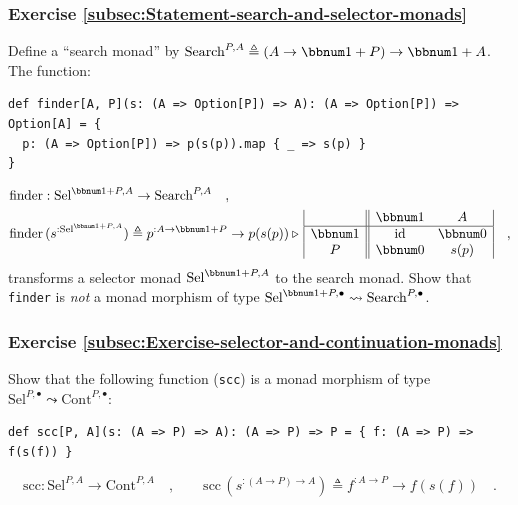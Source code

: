 \subsubsection{Exercise \label{subsec:Statement-search-and-selector-monads}\ref{subsec:Statement-search-and-selector-monads}}

Define a \textsf{``}search
monad\textsf{''} by $\text{Search}^{P,A}\triangleq(A\rightarrow\bbnum 1+P)\rightarrow\bbnum 1+A$.
The function:
\begin{lstlisting}
def finder[A, P](s: (A => Option[P]) => A): (A => Option[P]) => Option[A] = {
  p: (A => Option[P]) => p(s(p)).map { _ => s(p) }
}
\end{lstlisting}
\begin{align*}
 & \text{finder}:\text{Sel}^{\bbnum 1+P,A}\rightarrow\text{Search}^{P,A}\quad,\\
 & \text{finder}\,(s^{:\text{Sel}^{\bbnum 1+P,A}})\triangleq p^{:A\rightarrow\bbnum 1+P}\rightarrow p(s(p))\triangleright\,\begin{array}{|c||cc|}
 & \bbnum 1 & A\\
\hline \bbnum 1 & \text{id} & \bbnum 0\\
P & \bbnum 0 & s(p)
\end{array}\quad,
\end{align*}
transforms a selector
monad $\text{Sel}^{\bbnum 1+P,A}$ to the search monad. Show that
\lstinline!finder! is \emph{not} a monad morphism of type $\text{Sel}^{\bbnum 1+P,\bullet}\leadsto\text{Search}^{P,\bullet}$.

\subsubsection{Exercise \label{subsec:Exercise-selector-and-continuation-monads}\ref{subsec:Exercise-selector-and-continuation-monads}}

Show that the following function (\lstinline!scc!) is a monad morphism
of type $\text{Sel}^{P,\bullet}\leadsto\text{Cont}^{P,\bullet}$:
\begin{lstlisting}
def scc[P, A](s: (A => P) => A): (A => P) => P = { f: (A => P) => f(s(f)) }
\end{lstlisting}
\[
\text{scc}:\text{Sel}^{P,A}\rightarrow\text{Cont}^{P,A}\quad,\quad\quad\text{scc}\,(s^{:(A\rightarrow P)\rightarrow A})\triangleq f^{:A\rightarrow P}\rightarrow f(s(f))\quad.
\]

